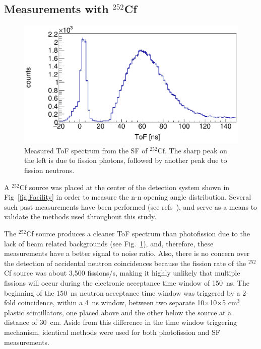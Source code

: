 \documentclass[%
 reprint,
 calc,
 amsmath,amssymb,
 aps,
 nofootinbib,
 linenumbers
]{revtex4-1}
\begin{document}
\subsection{Measurements with $^{252}$Cf}
\begin{figure}[h]
\includegraphics[width=\figsmall\textwidth]{Cf252ToF.png}
\caption{Measured ToF spectrum from the SF of $^{252}$Cf. The sharp peak on the left is due to fission photons, followed by another peak due to fission neutrons.}
\label{fig:Cf252ToF}
\end{figure}
A $^{252}$Cf source was placed at the center of the detection system shown in Fig~\ref{fig:Facility} in order to measure the n-n opening angle distribution.
Several such past measurements have been performed (see refs~\cite{1975Cf252, Pozzi2014, 2008CF252, Verbeke2018}), and serve as a means to validate the methods used throughout this study.

The $^{252}$Cf source produces a cleaner ToF spectrum than photofission due to the lack of beam related backgrounds (see Fig.~\ref{fig:Cf252ToF}), and, therefore, these measurements have a better signal to noise ratio.
Also, there is no concern over the detection of accidental neutron coincidences because the fission rate of the $^{252}$Cf source was about 3,500 fissions/s, making it highly unlikely that multiple fissions will occur during the electronic acceptance time window of 150~ns.
The beginning of the 150~ns neutron acceptance time window was triggered by a 2-fold coincidence, within a 4~ns window, between two separate 10$\times$10$\times$5 cm$^3$ plastic scintillators, one placed above and the other below the source at a distance of 30~cm.
Aside from this difference in the time window triggering mechanism, identical methods were used for both photofission and SF measurements.
\FloatBarrier
\end{document}
